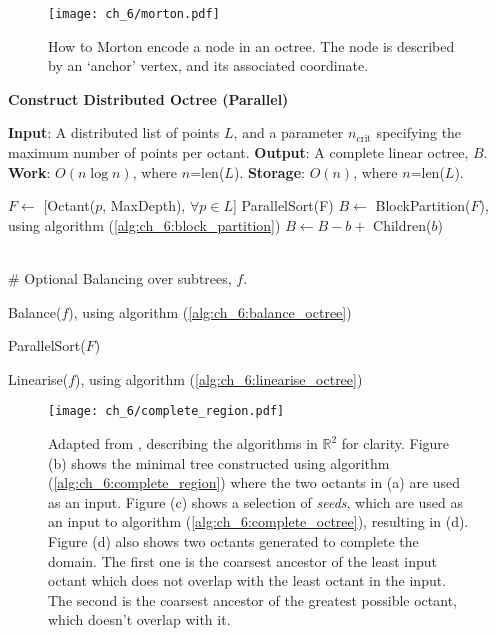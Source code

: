\begin{figure}
    \centerline{\texttt{[image: ch\_6/morton.pdf]}}
    \caption{How to Morton encode a node in an octree. The node is described by an `anchor' vertex, and its associated coordinate.}
    \label{fig:ch_6:morton}
\end{figure}

\begin{algorithm}
    \caption{\textbf{Construct Distributed Octree (Parallel)}}
    \label{alg:ch_6:point2octree}
    \begin{algorithmic}
        \STATE \textbf{Input}: A distributed list of points $L$, and a parameter $n_{\text{crit}}$ specifying the maximum number of points per octant.
        \STATE \textbf{Output}: A complete linear octree, $B$. 
        \STATE \textbf{Work}: $O(n \log n)$, where $n$=len($L$).
        \STATE \textbf{Storage}: $O(n)$, where $n$=len($L$).
        
        \STATE $F \gets $ [Octant($p$, MaxDepth), $\forall p \in L$]
        \STATE ParallelSort(F)
        \STATE $B \gets $ BlockPartition($F$), using algorithm (\ref{alg:ch_6:block_partition})
                \STATE $B \gets B - b + $ Children($b$)
            \ENDIF
        \ENDFOR

        \STATE \\\# Optional Balancing over subtrees, $f$.

                \STATE Balance($f$), using algorithm (\ref{alg:ch_6:balance_octree})
            \ENDFOR

            \STATE ParallelSort($F$)
            
                \STATE Linearise($f$), using algorithm (\ref{alg:ch_6:linearise_octree})
            \ENDFOR
        \ENDIF

    \end{algorithmic}
\end{algorithm}

\begin{figure}
    \centerline{\texttt{[image: ch\_6/complete\_region.pdf]}}
    \caption{Adapted from \cite{sundar2008bottom}, describing the algorithms in $\mathbb{R}^2$ for clarity. Figure (b) shows the minimal tree constructed using algorithm (\ref{alg:ch_6:complete_region}) where the two octants in (a) are used as an input. Figure (c) shows a selection of \textit{seeds}, which are used as an input to algorithm (\ref{alg:ch_6:complete_octree}), resulting in (d). Figure (d) also shows two octants generated to complete the domain.  The first one is the coarsest ancestor of the least input octant which does not overlap with the least octant in the input. The second is the coarsest ancestor of the greatest possible octant, which doesn't overlap with it.}
    \label{fig:ch_6:complete}
\end{figure}

